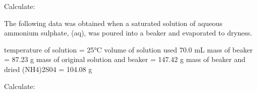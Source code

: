 \documentclass[fleqn]{exam}
\begin{document}
\begin{questions}
  Calculate:
  \newpage

  \question The following data was obtained when a saturated solution of aqueous ammonium sulphate,
  (aq), was poured into a beaker and evaporated to dryness.
  \begin{center}
    temperature of solution = 25°C \newline
    volume of solution used 70.0 mL \newline
    mass of beaker = 87.23 g \newline
    mass of original solution and beaker = 147.42 g \newline
    mass of beaker and dried (NH4)2S04 = 104.08 g \newline
  \end{center}
  Calculate:
\end{questions}
\end{document}
